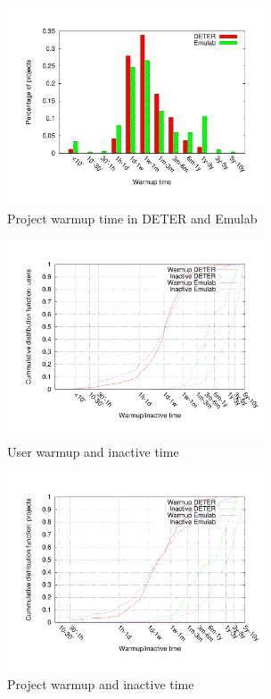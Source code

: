 \documentclass[10pt, twocolumn]{article} %
\begin{document}
\begin{figure}[htbp] \begin{center}
\includegraphics[width=3in]{figs/warmup_proj.pdf} \caption{Project
warmup time in DETER and Emulab} \label{warmuppr} \end{center}
\end{figure}


\begin{figure}[htbp] \begin{center}
\includegraphics[width=3in]{figs/warmup_inact_user.pdf} \caption{User
warmup and inactive time} \label{warmupinus} \end{center} \end{figure}


\begin{figure}[htbp] \begin{center}
\includegraphics[width=3in]{figs/warmup_inact_proj.pdf} \caption{Project
warmup and inactive time} \label{warmupinpr} \end{center} \end{figure}
\end{document}

